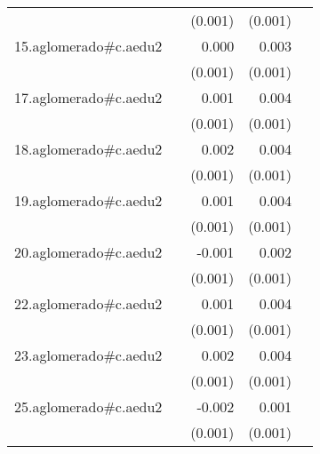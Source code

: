 {\begin{longtable}{l*{4}{D{.}{.}{-1}}}
            &                     &     (0.001)         &     (0.001)         &                     \\
\addlinespace
15.aglomerado#c.aedu2&                     &       0.000         &       0.003\sym{***}&                     \\
            &                     &     (0.001)         &     (0.001)         &                     \\
\addlinespace
17.aglomerado#c.aedu2&                     &       0.001         &       0.004\sym{***}&                     \\
            &                     &     (0.001)         &     (0.001)         &                     \\
\addlinespace
18.aglomerado#c.aedu2&                     &       0.002         &       0.004\sym{***}&                     \\
            &                     &     (0.001)         &     (0.001)         &                     \\
\addlinespace
19.aglomerado#c.aedu2&                     &       0.001         &       0.004\sym{***}&                     \\
            &                     &     (0.001)         &     (0.001)         &                     \\
\addlinespace
20.aglomerado#c.aedu2&                     &      -0.001         &       0.002         &                     \\
            &                     &     (0.001)         &     (0.001)         &                     \\
\addlinespace
22.aglomerado#c.aedu2&                     &       0.001         &       0.004\sym{***}&                     \\
            &                     &     (0.001)         &     (0.001)         &                     \\
\addlinespace
23.aglomerado#c.aedu2&                     &       0.002         &       0.004\sym{***}&                     \\
            &                     &     (0.001)         &     (0.001)         &                     \\
\addlinespace
25.aglomerado#c.aedu2&                     &      -0.002         &       0.001         &                     \\
            &                     &     (0.001)         &     (0.001)         &                     \\

\end{longtable}}
